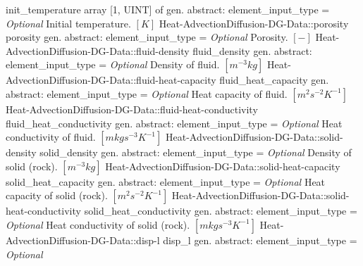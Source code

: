 \begin{RecordType}
			{init{\_}temperature}
			{{array [1, UINT] of }{gen. abstract: }}{{element{\_}input{\_}type}{ = }}
			{ \it{Optional}}
			{{{Initial temperature. }{$[K]$}%
}}
		\RecKey
			{Heat-AdvectionDiffusion-DG-Data::porosity}
			{porosity}
			{{gen. abstract: }}{{element{\_}input{\_}type}{ = }}
			{ \it{Optional}}
			{{{Porosity. }{$[-]$}%
}}
		\RecKey
			{Heat-AdvectionDiffusion-DG-Data::fluid-density}
			{fluid{\_}density}
			{{gen. abstract: }}{{element{\_}input{\_}type}{ = }}
			{ \it{Optional}}
			{{{Density of fluid. }{$[m^{-3}kg]$}%
}}
		\RecKey
			{Heat-AdvectionDiffusion-DG-Data::fluid-heat-capacity}
			{fluid{\_}heat{\_}capacity}
			{{gen. abstract: }}{{element{\_}input{\_}type}{ = }}
			{ \it{Optional}}
			{{{Heat capacity of fluid. }{$[m^{2}s^{-2}K^{-1}]$}%
}}
		\RecKey
			{Heat-AdvectionDiffusion-DG-Data::fluid-heat-conductivity}
			{fluid{\_}heat{\_}conductivity}
			{{gen. abstract: }}{{element{\_}input{\_}type}{ = }}
			{ \it{Optional}}
			{{{Heat conductivity of fluid. }{$[mkgs^{-3}K^{-1}]$}%
}}
		\RecKey
			{Heat-AdvectionDiffusion-DG-Data::solid-density}
			{solid{\_}density}
			{{gen. abstract: }}{{element{\_}input{\_}type}{ = }}
			{ \it{Optional}}
			{{{Density of solid (rock). }{$[m^{-3}kg]$}%
}}
		\RecKey
			{Heat-AdvectionDiffusion-DG-Data::solid-heat-capacity}
			{solid{\_}heat{\_}capacity}
			{{gen. abstract: }}{{element{\_}input{\_}type}{ = }}
			{ \it{Optional}}
			{{{Heat capacity of solid (rock). }{$[m^{2}s^{-2}K^{-1}]$}%
}}
		\RecKey
			{Heat-AdvectionDiffusion-DG-Data::solid-heat-conductivity}
			{solid{\_}heat{\_}conductivity}
			{{gen. abstract: }}{{element{\_}input{\_}type}{ = }}
			{ \it{Optional}}
			{{{Heat conductivity of solid (rock). }{$[mkgs^{-3}K^{-1}]$}%
}}
		\RecKey
			{Heat-AdvectionDiffusion-DG-Data::disp-l}
			{disp{\_}l}
			{{gen. abstract: }}{{element{\_}input{\_}type}{ = }}
			{ \it{Optional}}

\end{RecordType}
